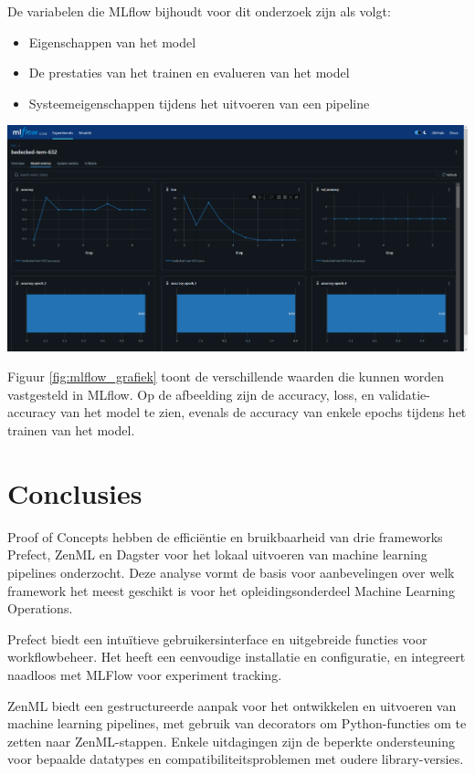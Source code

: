 \documentclass[a0,portrait]{hogent-poster}
\begin{document}
\begin{multicols}{2}
De variabelen die MLflow bijhoudt voor dit onderzoek zijn als volgt:
\begin{itemize}
  \item Eigenschappen van het model
  \item De prestaties van het trainen en evalueren van het model
  \item Systeemeigenschappen tijdens het uitvoeren van een pipeline
\end{itemize}

\begin{center}
  \captionsetup{type=figure}
  \includegraphics[width=1.0\linewidth]{graphics/mlflow_Graph.PNG}
  \label{fig:mlflow_grafiek}
\end{center}

Figuur \ref{fig:mlflow_grafiek} toont de verschillende waarden die kunnen worden vastgesteld in MLflow. Op de afbeelding zijn de accuracy, loss, en validatie-accuracy van het model te zien, evenals de accuracy van enkele epochs tijdens het trainen van het model.
\section{Conclusies}

Proof of Concepts hebben de efficiëntie en bruikbaarheid van drie frameworks Prefect, ZenML en Dagster voor het lokaal uitvoeren van machine learning pipelines onderzocht. Deze analyse vormt de basis voor aanbevelingen over welk framework het meest geschikt is voor het opleidingsonderdeel Machine Learning Operations.

Prefect biedt een intuïtieve gebruikersinterface en uitgebreide functies voor workflowbeheer. Het heeft een eenvoudige installatie en configuratie, en integreert naadloos met MLFlow voor experiment tracking.

ZenML biedt een gestructureerde aanpak voor het ontwikkelen en uitvoeren van machine learning pipelines, met gebruik van decorators om Python-functies om te zetten naar ZenML-stappen. Enkele uitdagingen zijn de beperkte ondersteuning voor bepaalde datatypes en compatibiliteitsproblemen met oudere library-versies.


\end{multicols}
\end{document}
